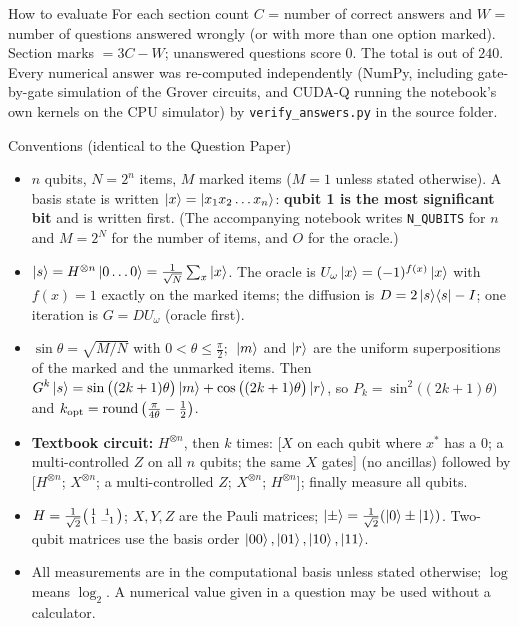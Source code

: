 \documentclass[11pt,a4paper]{article}
\begin{document}
\begin{infobox}{How to evaluate}
For each section count $C$ = number of correct answers and $W$ = number of questions answered wrongly (or with more than one option marked). Section marks $= 3C - W$; unanswered questions score $0$. The total is out of $240$.
Every numerical answer was re-computed independently (NumPy, including gate-by-gate simulation of the Grover circuits, and CUDA-Q running the notebook's own kernels on
the CPU simulator) by \texttt{verify\_answers.py} in the source folder.
\end{infobox}
\begin{infobox}{Conventions (identical to the Question Paper)}

\begin{itemize}[leftmargin=1.2em, itemsep=1pt, topsep=2pt]
\item $n$ qubits, $N = 2^n$ items, $M$ marked items ($M = 1$ unless stated otherwise). A basis state is written $\ket{x} = \ket{x_1x_2\dots x_n}$:
      \textbf{qubit 1 is the most significant bit} and is written first. (The accompanying notebook writes \texttt{N\_QUBITS} for $n$ and $M = 2^{N}$ for the number of items, and $O$ for the oracle.)
\item $\ket{s} = H^{\otimes n}\ket{0\dots0} = \frac{1}{\sqrt N}\sum_x\ket{x}$. The oracle is $U_\omega\ket{x} = (-1)^{f(x)}\ket{x}$ with $f(x) = 1$ exactly on the marked items; the diffusion is $D = 2\ket{s}\!\bra{s} - I$; one iteration is $G = DU_\omega$ (oracle first).
\item $\sin\theta = \sqrt{M/N}$ with $0 < \theta \le \frac\pi2$; $\;\ket{m}$ and $\ket{r}$ are the uniform superpositions of the marked and the unmarked items. Then
      $\displaystyle G^k\ket{s} = \sin\big((2k+1)\theta\big)\ket{m} + \cos\big((2k+1)\theta\big)\ket{r}$, so $P_k = \sin^2\big((2k+1)\theta\big)$ and
      $k_{\rm opt} = \operatorname{round}\big(\frac{\pi}{4\theta} - \frac12\big)$.
\item \textbf{Textbook circuit:} $H^{\otimes n}$, then $k$ times: [$X$ on each qubit where $x^\ast$ has a $0$; a multi-controlled $Z$ on all $n$ qubits; the same $X$ gates] (no ancillas) followed by [$H^{\otimes n}$; $X^{\otimes n}$; a multi-controlled $Z$; $X^{\otimes n}$; $H^{\otimes n}$]; finally measure all qubits.
\item $H = \frac{1}{\sqrt2}\begin{psmallmatrix}1&1\\1&-1\end{psmallmatrix}$; $X, Y, Z$ are the Pauli matrices; $\ket{\pm} = \frac{1}{\sqrt2}(\ket0 \pm \ket1)$. Two-qubit matrices use the basis order $\ket{00}, \ket{01}, \ket{10}, \ket{11}$.
\item All measurements are in the computational basis unless stated otherwise; $\log$ means $\log_2$. A numerical value given in a question may be used without a calculator.
\end{itemize}
\end{infobox}
\newpage
\end{document}
